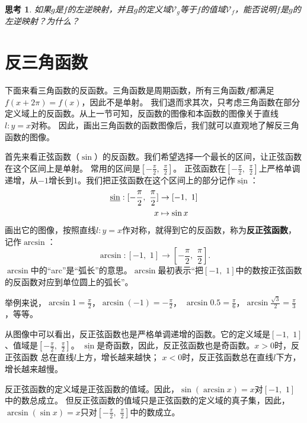\documentclass[12pt,UTF8]{ctexbook}
\newtheorem{sk}{思考}[section]
\begin{document}
\begin{sk}
    如果$g$是$f$的左逆映射，并且$g$的定义域$\mathcal{V}_g$等于$f$的值域$\mathcal{V}_f$，能否说明$f$是$g$的左逆映射？为什么？
\end{sk}

\section{反三角函数}

下面来看三角函数的反函数。三角函数是周期函数，所有三角函数$f$都满足$f(x+2\pi) = f(x)$，因此不是单射。
我们退而求其次，只考虑三角函数在部分定义域上的反函数。从上一节可知，反函数的图像和本函数的图像关于直线$l: y = x$对称。
因此，画出三角函数的函数图像后，我们就可以直观地了解反三角函数的图像。


首先来看正弦函数（$\sin$）的反函数。我们希望选择一个最长的区间，让正弦函数在这个区间上是单射。
常用的区间是$[-\frac{\pi}{2}, \,\, \frac{\pi}{2}]$。
正弦函数在$[-\frac{\pi}{2}, \,\, \frac{\pi}{2}]$上严格单调递增，从$-1$增长到$1$。我们把正弦函数在这个区间上的部分记作$\underline{\sin}$：
\begin{align}
     \underline{\sin} : [-\frac{\pi}{2}, \,\, \frac{\pi}{2}] &\rightarrow [-1,\,\, 1]\notag \\
                                                           x &\mapsto \sin{x} \notag
\end{align}
画出它的图像，按照直线$l: y = x$作对称，就得到它的反函数，称为\textbf{反正弦函数}，记作$\arcsin$：
$$ \arcsin : [-1,\,\, 1] \rightarrow [-\frac{\pi}{2}, \,\, \frac{\pi}{2}] . $$
$\arcsin$中的“arc”是“弧长”的意思。$\arcsin$最初表示“把$[-1,\,\, 1]$中的数按正弦函数的反函数对应到单位圆上的弧长”。

举例来说，$\arcsin{1} = \frac{\pi}{2}$，$\arcsin{(-1)} = -\frac{\pi}{2}$，
$\arcsin{0.5} = \frac{\pi}{6}$，$\arcsin{\frac{\sqrt{3}}{2}} = \frac{\pi}{3}$，等等。

从图像中可以看出，反正弦函数也是严格单调递增的函数。它的定义域是$[-1,\,\, 1]$、值域是$[-\frac{\pi}{2}, \,\, \frac{\pi}{2}]$。
$\underline{\sin}$是奇函数，因此，反正弦函数也是奇函数。$x > 0$时，反正弦函数
总在直线$l$上方，增长越来越快；
$x < 0$时，反正弦函数总在直线$l$下方，增长越来越慢。

反正弦函数的定义域是正弦函数的值域。因此，$\sin{(\arcsin{x})} = x$对$[-1,\,\, 1]$中的数总成立。
但反正弦函数的值域只是正弦函数的定义域的真子集，因此，$\arcsin{(\sin{x})} = x$只对$[-\frac{\pi}{2}, \,\, \frac{\pi}{2}]$中的数成立。
\end{document}
